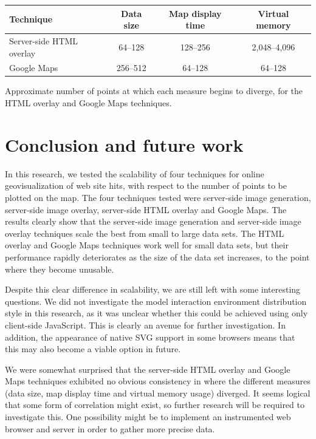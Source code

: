 \documentclass[acmnow]{acmtrans2m}
\begin{document}
\begin{acmtable}{11cm}
	\centering
	\begin{tabular}{lccc}
		Technique						&	Data size	&	Map display time	&	Virtual memory	\\
		\hline
		Server-side HTML overlay		&	64--128		&	128--256			&	2,048--4,096 \\
		Google Maps						&	256--512	&	64--128				&	64--128	\\
	\end{tabular}
	\caption{Approximate number of points at which each measure begins to diverge,
		for the HTML overlay and Google Maps techniques.}
	\label{tab-divergence}
\end{acmtable}


\section{Conclusion and future work}
\label{sec-conclusion}

In this research, we tested the scalability of four techniques for
online geovisualization of web site hits, with respect to the number of
points to be plotted on the map. The four techniques tested were
server-side image generation, server-side image overlay, server-side
HTML overlay and Google Maps. The results clearly show that the
server-side image generation and server-side image overlay techniques
scale the best from small to large data sets. The HTML overlay and
Google Maps techniques work well for small data sets, but their
performance rapidly deteriorates as the size of the data set increases,
to the point where they become unusable.

Despite this clear difference in scalability, we are still left with
some interesting questions. We did not investigate the model interaction
environment distribution style in this research, as it was unclear
whether this could be achieved using only client-side JavaScript. This
is clearly an avenue for further investigation. In addition, the
appearance of native SVG support in some browsers means that this may
also become a viable option in future.

We were somewhat surprised that the server-side HTML overlay and Google
Maps techniques exhibited no obvious consistency in where the different
measures (data size, map display time and virtual memory usage)
diverged. It seems logical that some form of correlation might exist, so
further research will be required to investigate this. One possibility
might be to implement an instrumented web browser and server in order to
gather more precise data.
\end{document}

